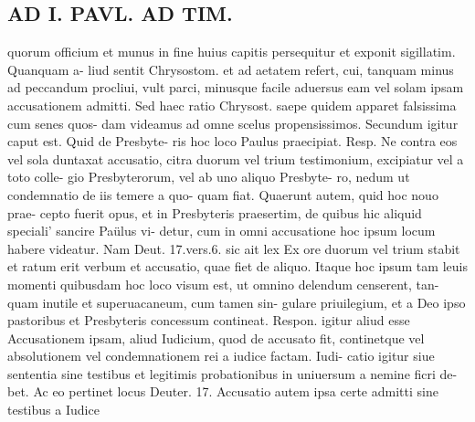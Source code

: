 \documentclass{article}
\begin{document}
\begin{pages}
\section*{AD I. PAVL. AD TIM. }
\marginpar{[ p.51 ]}quorum officium et munus in fine huius capitis persequitur et exponit sigillatim. Quanquam a- liud sentit Chrysostom. et ad aetatem refert, cui, tanquam minus ad peccandum procliui, vult parci, minusque facile aduersus eam vel solam ipsam accusationem admitti. Sed haec ratio Chrysost. saepe quidem apparet falsissima cum senes quos- dam videamus ad omne scelus propensissimos. Secundum igitur caput est. Quid de Presbyte- ris hoc loco Paulus praecipiat. Resp. Ne contra eos vel sola duntaxat accusatio, citra duorum vel trium testimonium, excipiatur vel a toto colle- gio Presbyterorum, vel ab uno aliquo Presbyte- ro, nedum ut condemnatio de iis temere a quo- quam fiat. Quaerunt autem, quid hoc nouo prae- cepto fuerit opus, et in Presbyteris praesertim, de quibus hic aliquid speciali' sancire Paülus vi- detur, cum in omni accusatione hoc ipsum locum habere videatur. Nam Deut. 17.vers.6. sic ait lex Ex ore duorum vel trium stabit et ratum erit verbum et accusatio, quae fiet de aliquo. Itaque hoc ipsum tam leuis momenti quibusdam hoc loco visum est, ut omnino delendum censerent, tan- quam inutile et superuacaneum, cum tamen sin- gulare priuilegium, et a Deo ipso pastoribus et Presbyteris concessum contineat. Respon. igitur aliud esse Accusationem ipsam, aliud Iudicium, quod de accusato fit, continetque vel absolutionem vel condemnationem rei a iudice factam. Iudi- catio igitur siue sententia sine testibus et legitimis probationibus in uniuersum a nemine ficri de- bet. Ac eo pertinet locus Deuter. 17. Accusatio autem ipsa certe admitti sine testibus a Iudice 

\end{pages}
\end{document}
